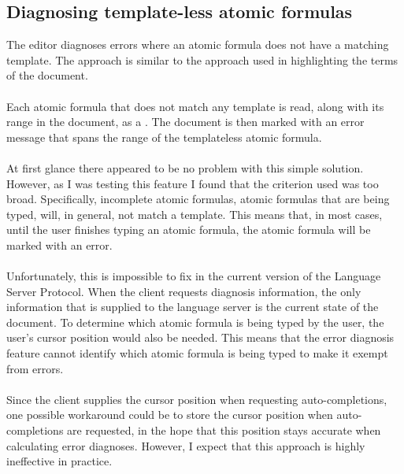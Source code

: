 \documentclass[../main.tex]{subfiles}
\begin{document}
\subsection{Diagnosing template-less atomic formulas}
The editor diagnoses errors where an atomic formula does not have a matching template. The approach is similar to the approach used in highlighting the terms of the document. 
\\
\\
Each atomic formula that does not match any template is read, along with its range in the document, as a . The document is then marked with an error message that spans the range of the templateless atomic formula.
\\
\\
At first glance there appeared to be no problem with this simple solution. However, as I was testing this feature I found that the criterion used was too broad. Specifically, incomplete atomic formulas, atomic formulas that are being typed, will, in general, not match a template. This means that, in most cases, until the user finishes typing an atomic formula, the atomic formula will be marked with an error. 
\\
\\
Unfortunately, this is impossible to fix in the current version of the Language Server Protocol. When the client requests diagnosis information, the only information that is supplied to the language server is the current state of the document. To determine which atomic formula is being typed by the user, the user's cursor position would also be needed. This means that the error diagnosis feature cannot identify which atomic formula is being typed to make it exempt from errors. 
\\
\\
Since the client supplies the cursor position when requesting auto-completions, one possible workaround could be to store the cursor position when auto-completions are requested, in the hope that this position stays accurate when calculating error diagnoses. However, I expect that this approach is highly ineffective in practice.
\end{document}
